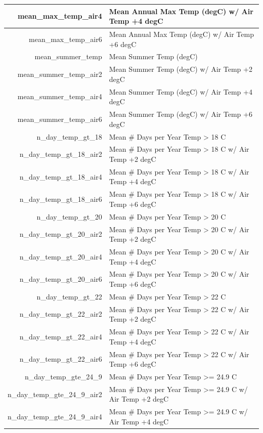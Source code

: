 \documentclass[
]{book}
\begin{document}
\begin{tabular}{r|l}
\hline
mean\_max\_temp\_air4 & Mean Annual Max Temp (degC) w/ Air Temp +4 degC\\
\hline
mean\_max\_temp\_air6 & Mean Annual Max Temp (degC) w/ Air Temp +6 degC\\
\hline
mean\_summer\_temp & Mean Summer Temp (degC)\\
\hline
mean\_summer\_temp\_air2 & Mean Summer Temp (degC) w/ Air Temp +2 degC\\
\hline
mean\_summer\_temp\_air4 & Mean Summer Temp (degC) w/ Air Temp +4 degC\\
\hline
mean\_summer\_temp\_air6 & Mean Summer Temp (degC) w/ Air Temp +6 degC\\
\hline
n\_day\_temp\_gt\_18 & Mean \# Days per Year Temp > 18 C\\
\hline
n\_day\_temp\_gt\_18\_air2 & Mean \# Days per Year Temp > 18 C w/ Air Temp +2 degC\\
\hline
n\_day\_temp\_gt\_18\_air4 & Mean \# Days per Year Temp > 18 C w/ Air Temp +4 degC\\
\hline
n\_day\_temp\_gt\_18\_air6 & Mean \# Days per Year Temp > 18 C w/ Air Temp +6 degC\\
\hline
n\_day\_temp\_gt\_20 & Mean \# Days per Year Temp > 20 C\\
\hline
n\_day\_temp\_gt\_20\_air2 & Mean \# Days per Year Temp > 20 C w/ Air Temp +2 degC\\
\hline
n\_day\_temp\_gt\_20\_air4 & Mean \# Days per Year Temp > 20 C w/ Air Temp +4 degC\\
\hline
n\_day\_temp\_gt\_20\_air6 & Mean \# Days per Year Temp > 20 C w/ Air Temp +6 degC\\
\hline
n\_day\_temp\_gt\_22 & Mean \# Days per Year Temp > 22 C\\
\hline
n\_day\_temp\_gt\_22\_air2 & Mean \# Days per Year Temp > 22 C w/ Air Temp +2 degC\\
\hline
n\_day\_temp\_gt\_22\_air4 & Mean \# Days per Year Temp > 22 C w/ Air Temp +4 degC\\
\hline
n\_day\_temp\_gt\_22\_air6 & Mean \# Days per Year Temp > 22 C w/ Air Temp +6 degC\\
\hline
n\_day\_temp\_gte\_24\_9 & Mean \# Days per Year Temp >= 24.9 C\\
\hline
n\_day\_temp\_gte\_24\_9\_air2 & Mean \# Days per Year Temp >= 24.9 C w/ Air Temp +2 degC\\
\hline
n\_day\_temp\_gte\_24\_9\_air4 & Mean \# Days per Year Temp >= 24.9 C w/ Air Temp +4 degC\\
\hline

\end{tabular}
\end{document}
